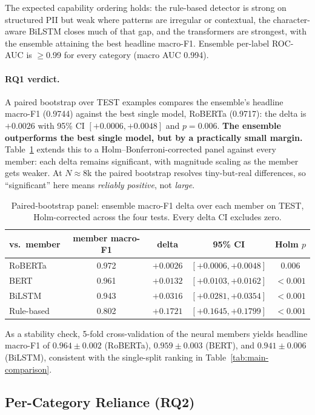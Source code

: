 \documentclass{article}
\begin{document}
The expected capability ordering holds: the rule-based detector is
strong on structured PII but weak where patterns are irregular or
contextual, the character-aware BiLSTM closes much of that gap, and the
transformers are strongest, with the ensemble attaining the best
headline macro-F1. Ensemble per-label ROC-AUC is $\geq$0.99 for every
category (macro AUC 0.994).

\paragraph{RQ1 verdict.} A paired bootstrap over TEST examples compares
the ensemble's headline macro-F1 (0.9744) against the best single model,
RoBERTa (0.9717): the delta is $+0.0026$ with 95\% CI
$[+0.0006, +0.0048]$ and $p = 0.006$. \textbf{The ensemble outperforms
the best single model, but by a practically small margin.}
Table~\ref{tab:pairwise} extends this to a Holm--Bonferroni-corrected
panel against every member: each delta remains significant, with
magnitude scaling as the member gets weaker. At $N \approx 8$k the
paired bootstrap resolves tiny-but-real differences, so ``significant''
here means \emph{reliably positive}, not \emph{large}.

\begin{table}[t]
\centering
\small
\begin{tabular}{lcccc}
\hline
vs.\ member & member macro-F1 & delta & 95\% CI & Holm $p$ \\
\hline
RoBERTa    & 0.972 & $+0.0026$ & $[+0.0006, +0.0048]$ & 0.006 \\
BERT       & 0.961 & $+0.0132$ & $[+0.0103, +0.0162]$ & $<0.001$ \\
BiLSTM     & 0.943 & $+0.0316$ & $[+0.0281, +0.0354]$ & $<0.001$ \\
Rule-based & 0.802 & $+0.1721$ & $[+0.1645, +0.1799]$ & $<0.001$ \\
\hline
\end{tabular}
\caption{Paired-bootstrap panel: ensemble macro-F1 delta over each
member on TEST, Holm-corrected across the four tests. Every delta CI
excludes zero.}
\label{tab:pairwise}
\end{table}

As a stability check, 5-fold cross-validation of the neural members
yields headline macro-F1 of $0.964 \pm 0.002$ (RoBERTa),
$0.959 \pm 0.003$ (BERT), and $0.941 \pm 0.006$ (BiLSTM), consistent
with the single-split ranking in Table~\ref{tab:main-comparison}.

\subsection{Per-Category Reliance (RQ2)}
\label{subsec:rq2}
\end{document}
